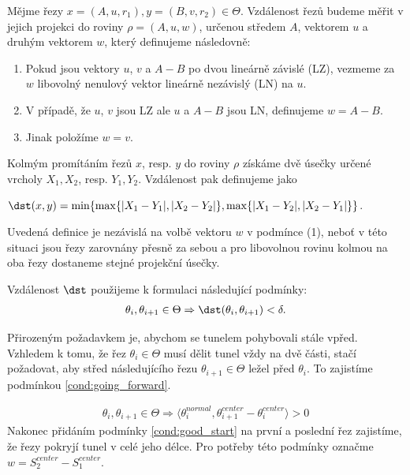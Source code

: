\begin{defi}
Mějme řezy $ x = (A, u, r_1), y = (B, v, r_2) \in \Theta $. Vzdálenost řezů budeme
měřit v jejich projekci do roviny $ \rho = (A, u, w) $, určenou středem $ A $,
vektorem $ u $ a druhým vektorem $ w $, který definujeme následovně:
    \begin{enumerate}[label={(\arabic*)}]
        \item Pokud jsou vektory $ u $, $ v $ a $ A - B $ po dvou lineárně závislé (LZ), vezmeme
            za $ w $ libovolný nenulový vektor lineárně nezávislý (LN) na $ u $.
        \item V případě, že $ u $, $ v $ jsou LZ ale $ u $ a $ A - B $ jsou LN,
            definujeme $ w = A - B $.
        \item Jinak položíme $ w = v $.
    \end{enumerate}
Kolmým promítáním řezů $ x $, resp. $ y $ do roviny  $ \rho $ získáme dvě úsečky
určené vrcholy $X_1, X_2 $, resp. $Y_1, Y_2 $. Vzdálenost pak definujeme jako
\begin{center}
    $ \dst(x, y) = \min\{ \max\{|X_1 - Y_1|, |X_2 - Y_2|\}, \max\{|X_1 - Y_2|, |X_2 - Y_1|\}\}$.
\end{center}
\end{defi}

Uvedená definice je nezávislá na volbě vektoru $ w $ v podmínce (1), neboť
v této situaci jsou řezy zarovnány přesně za sebou a pro libovolnou rovinu
kolmou na oba řezy dostaneme stejné projekční úsečky.

Vzdálenost $ \dst $ použijeme k formulaci následující podmínky:
\begin{align}
    \theta_i, \theta_{i+1} \in \Theta \Rightarrow \dst(\theta_i, \theta_{i+1}) < \delta.
    \label{cond:distance}
\end{align}


Přirozeným požadavkem je, abychom se tunelem pohybovali stále vpřed.
Vzhledem k tomu, že řez $ \theta_i \in \Theta $ musí dělit tunel vždy na dvě části, stačí
požadovat, aby střed následujícího řezu $ \theta_{i + 1} \in \Theta $ ležel před
$ \theta_i $. To zajistíme podmínkou \ref{cond:going_forward}.

\begin{align}
    \theta_i, \theta_{i+1} \in \Theta
        \Rightarrow \langle \theta_i^{normal}, \theta_{i+1}^{center} - \theta_i^{center} \rangle > 0
        \label{cond:going_forward}
\end{align}
Nakonec přidáním podmínky \ref{cond:good_start} na první a poslední řez zajistíme,
že řezy pokryjí tunel v celé jeho délce. Pro potřeby této podmínky označme
$ w = S_2^{center} - S_1^{center} $.

